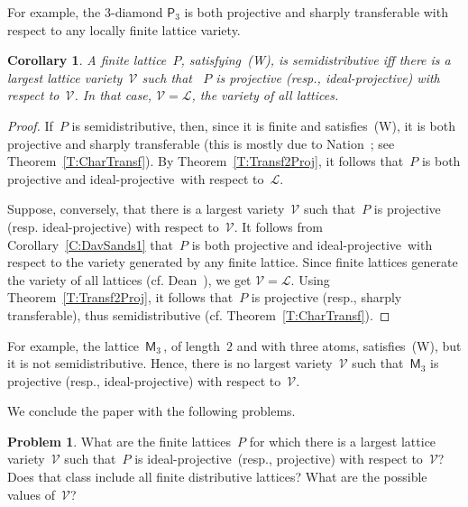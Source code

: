 \documentclass[reqno]{amsart}
\numberwithin{equation}{section}
\theoremstyle{plain}
\newtheorem{corollary}[theorem]{Corollary}
\theoremstyle{definition}
\newtheorem{problem}{Problem}
\theoremstyle{remark}
\numberwithin{figure}{section}
\numberwithin{table}{section}
\begin{document}
For example, the $3$-diamond ${{\mathsf{P}}}_3$ is both projective and sharply transferable with respect to any locally finite lattice variety.

\begin{corollary}\label{C:DavSands3}
A finite lattice~$P$, satisfying~\textup{(W)}, is semidistributive if{f} there is a largest lattice variety~${\mathcal{V}}$ such that~
$P$ is projective {\textup{(}{{resp., {i\-de\-al-pro\-jec\-tive}}}\textup{)}} with respect to~${\mathcal{V}}$.
In that case, ${\mathcal{V}}={\mathcal{L}}$, the variety of all lattices.
\end{corollary}

\begin{proof}
If~$P$ is semidistributive, then, since it is finite and satisfies~(W), it is both projective and sharply transferable (this is mostly due to Nation~\cite{Nation82}; see Theorem~\ref{T:CharTransf}).
By Theorem~\ref{T:Transf2Proj}, it follows that~$P$ is both projective and {i\-de\-al-pro\-jec\-tive}\ with respect to~${\mathcal{L}}$.

Suppose, conversely, that there is a largest variety~${\mathcal{V}}$ such that~$P$ is projective (resp. {i\-de\-al-pro\-jec\-tive}) with respect to~${\mathcal{V}}$.
It follows from Corollary~\ref{C:DavSands1} that~$P$ is both projective and {i\-de\-al-pro\-jec\-tive}\ with respect to the variety generated by any finite lattice.
Since finite lattices generate the variety of all lattices (cf. Dean~\cite{Dean56b}), we get ${\mathcal{V}}={\mathcal{L}}$.
Using Theorem~\ref{T:Transf2Proj}, it follows that~$P$ is projective (resp., sharply transferable), thus semidistributive (cf. Theorem~\ref{T:CharTransf}).
\end{proof}

For example, the lattice~${{\mathsf{M}}}_3$\,, of length~$2$ and with three atoms, satisfies~(W), but it is not semidistributive.
Hence, there is no largest variety~${\mathcal{V}}$ such that~${{\mathsf{M}}}_3$ is projective (resp., {i\-de\-al-pro\-jec\-tive}) with respect to~${\mathcal{V}}$.

We conclude the paper with the following problems.

\begin{problem}\label{Pb:ProjVar}
What are the finite lattices~$P$ for which there is a largest lattice variety~${\mathcal{V}}$ such that~$P$ is {i\-de\-al-pro\-jec\-tive}\ (resp., projective) with respect to~${\mathcal{V}}$?
Does that class include all finite distributive lattices?
What are the possible values of~${\mathcal{V}}$?
\end{problem}
\end{document}
